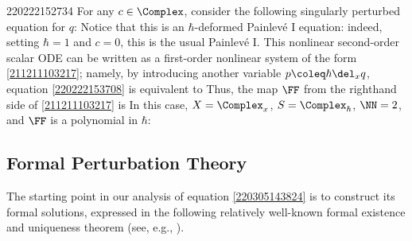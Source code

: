 \documentclass[11pt]{article}
\begin{document}
\begin{example}{220222152734}
For any $c \in \Complex$, consider the following singularly perturbed equation for $q$:
Notice that this is an $\hbar$-deformed Painlevé I equation: indeed, setting $\hbar = 1$ and $c = 0$, this is the usual Painlevé I.
This nonlinear second-order scalar ODE can be written as a first-order nonlinear system of the form \eqref{211211103217}; namely, by introducing another variable $p \coleq \hbar \del_x q$, equation \eqref{220222153708} is equivalent to
Thus, the map $\FF$ from the righthand side of \eqref{211211103217} is
In this case, $X = \Complex_x$, $S = \Complex_\hbar$, $\NN = 2$, and $\FF$ is a polynomial in $\hbar$:
\end{example}

\subsection{Formal Perturbation Theory}

The starting point in our analysis of equation \eqref{220305143824} is to construct its formal solutions, expressed in the following relatively well-known formal existence and uniqueness theorem (see, e.g., \cite[Theorem XII-5-2]{MR1697415}).
\end{document}
